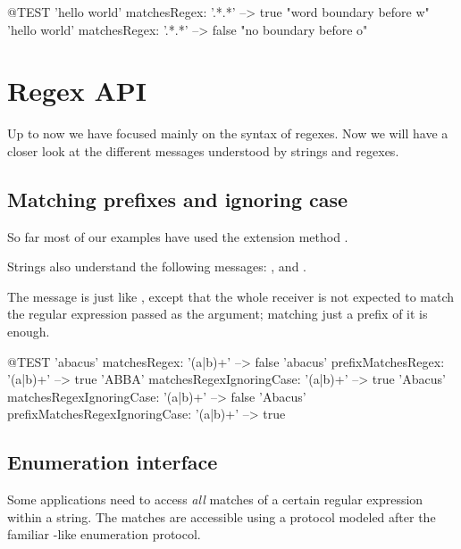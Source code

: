 \documentclass[a4paper,10pt,twoside]{book}
\begin{document}
{\begin{code}{@TEST}
'hello world' matchesRegex: '.*\bw.*' --> true      "word boundary before w"
'hello world' matchesRegex: '.*\bo.*'  --> false    "no boundary before o"
\end{code}

\section{Regex API}

Up to now we have focused mainly on the syntax of regexes.  Now we will have a closer look at the different messages understood by strings and regexes.

\subsection{Matching prefixes and ignoring case}

So far most of our examples have used the  extension method .

Strings also understand the following messages:
,  and
.

The message  is just like , except that the whole receiver is not expected to match the regular expression passed as the argument; matching just a prefix of it is enough.
\begin{code}{@TEST}
'abacus' matchesRegex: '(a|b)+'                                --> false
'abacus' prefixMatchesRegex: '(a|b)+'                       --> true
'ABBA' matchesRegexIgnoringCase: '(a|b)+'            --> true
'Abacus' matchesRegexIgnoringCase: '(a|b)+'          --> false
'Abacus' prefixMatchesRegexIgnoringCase: '(a|b)+' --> true
\end{code}

\subsection{Enumeration interface}

Some applications need to access \emph{all} matches of a certain regular expression within a string.  The matches are accessible using a protocol modeled after the familiar -like enumeration protocol.

}
\end{document}
